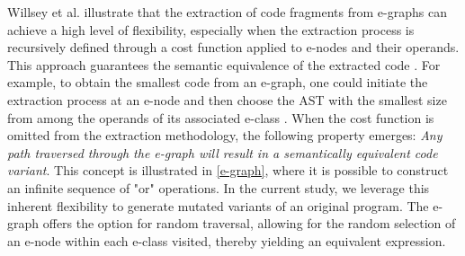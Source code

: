 
Willsey et al. illustrate that the extraction of code fragments from e-graphs can achieve a high level of flexibility, especially when the extraction process is recursively defined through a cost function applied to e-nodes and their operands. 
This approach guarantees the semantic equivalence of the extracted code \cite{10.1145/3434304}. 
For example, to obtain the smallest code from an e-graph, one could initiate the extraction process at an e-node and then choose the AST with the smallest size from among the operands of its associated e-class \cite{10.1145/3385412.3386012}.
When the cost function is omitted from the extraction methodology, the following property emerges:
\emph{Any path traversed through the e-graph will result in a semantically equivalent code variant}. 
This concept is illustrated in \autoref{e-graph}, where it is possible to construct an infinite sequence of "or" operations.
In the current study, we leverage this inherent flexibility to generate mutated variants of an original program. 
The e-graph offers the option for random traversal, allowing for the random selection of an e-node within each e-class visited, thereby yielding an equivalent expression.



 

